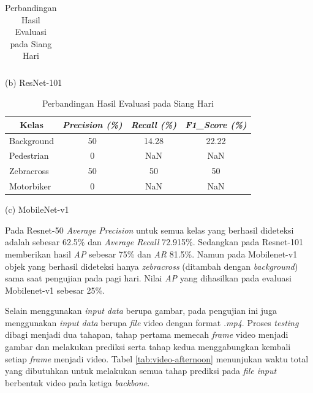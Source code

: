 \begin{table}[!h]
\begin{minipage}[b]{\textwidth}
\begin{tabular}{|l|c|c|c|}
		\end{tabular}
		\caption*{(b) ResNet-101}
	\end{minipage}
	\vfill
	\begin{minipage}[b]{\textwidth}
		\centering
		\begin{tabular}{|l|c|c|c|}
			\hline
			\multicolumn{1}{|c|}{\textbf{Kelas}} & \textit{\textbf{Precision (\%)}} & \textit{\textbf{Recall (\%)}} & \textit{\textbf{F1\_Score (\%)}} \\ \hline
			Background                           & 50                               & 14.28                         & 22.22                            \\ \hline
			Pedestrian                           & 0                                & NaN                           & NaN                              \\ \hline
			Zebracross                           & 50                               & 50                            & 50                               \\ \hline
			Motorbiker                           & 0                                & NaN                           & NaN                              \\ \hline
		\end{tabular}
		\caption*{(c) MobileNet-v1}
	\end{minipage}
	\caption{{Perbandingan Hasil Evaluasi pada Siang Hari}}
	\label{tab:evaluate-afternoon}
\end{table}

Pada Resnet-50 \textit{Average Precision} untuk semua kelas yang berhasil dideteksi adalah sebesar 62.5\% dan \textit{Average Recall} 72.915\%. Sedangkan pada Resnet-101 memberikan hasil \textit{AP} sebesar 75\% dan \textit{AR} 81.5\%. Namun pada Mobilenet-v1 objek yang berhasil dideteksi hanya \textit{zebracross} (ditambah dengan \textit{background}) sama saat pengujian pada pagi hari. Nilai \textit{AP} yang dihasilkan pada evaluasi Mobilenet-v1 sebesar 25\%.

Selain menggunakan \textit{input data} berupa gambar, pada pengujian ini juga menggunakan \textit{input data} berupa \textit{file} video dengan format \textit{.mp4}. Proses \textit{testing} dibagi menjadi dua tahapan, tahap pertama memecah \textit{frame} video menjadi gambar dan melakukan prediksi serta tahap kedua menggabungkan kembali setiap \textit{frame} menjadi video. Tabel \ref{tab:video-afternoon} menunjukan waktu total yang dibutuhkan untuk melakukan semua tahap prediksi pada \textit{file input} berbentuk video pada ketiga \textit{backbone}.

